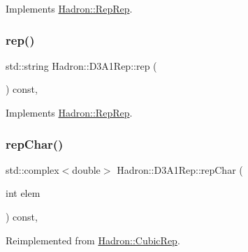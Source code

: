Implements \mbox{\hyperlink{structHadron_1_1RepRep_ab3213025f6de249f7095892109575fde}{Hadron\+::\+Rep\+Rep}}.

\mbox{\label{structHadron_1_1D3A1Rep_aa6bbeffd53b5c6efd58e5269da0779b2}} 
\subsubsection{\texorpdfstring{rep()}{rep()}\hspace{0.1cm}{\footnotesize\ttfamily [3/3]}}
{\footnotesize\ttfamily std\+::string Hadron\+::\+D3\+A1\+Rep\+::rep (\begin{DoxyParamCaption}{ }\end{DoxyParamCaption}) const\hspace{0.3cm}{\ttfamily [inline]}, {\ttfamily [virtual]}}



Implements \mbox{\hyperlink{structHadron_1_1RepRep_ab3213025f6de249f7095892109575fde}{Hadron\+::\+Rep\+Rep}}.

\mbox{\label{structHadron_1_1D3A1Rep_aa169675bc42e174827e727a1f3571227}} 
\subsubsection{\texorpdfstring{repChar()}{repChar()}\hspace{0.1cm}{\footnotesize\ttfamily [1/2]}}
{\footnotesize\ttfamily std\+::complex$<$double$>$ Hadron\+::\+D3\+A1\+Rep\+::rep\+Char (\begin{DoxyParamCaption}\item[{int}]{elem }\end{DoxyParamCaption}) const\hspace{0.3cm}{\ttfamily [inline]}, {\ttfamily [virtual]}}



Reimplemented from \mbox{\hyperlink{structHadron_1_1CubicRep_af45227106e8e715e84b0af69cd3b36f8}{Hadron\+::\+Cubic\+Rep}}.

